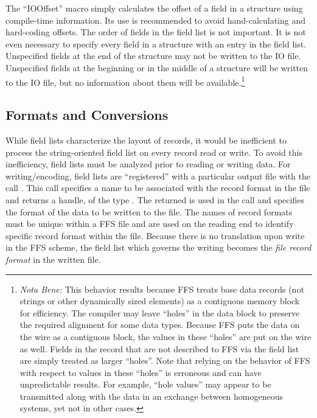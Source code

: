 The ``IOOffset'' macro simply calculates the offset of a field in a structure
using compile-time information.  Its use is recommended to avoid
hand-calculating and hard-coding offsets.  The order of fields in the field
list is not important.  It is not even necessary to specify every field
in a structure with an entry in the field list. Unspecified fields at the end
of the structure may not be written to the IO file.  Unspecified fields
at the beginning or in the middle of a structure will be written to the IO
file, but no information about them will be available.\footnote{{\it Nota
Bene:} This behavior results because FFS treats base data records (not
strings or other dynamically sized elements) as a contiguous memory block
for efficiency.  The compiler may leave ``holes'' in the data block to
preserve the required alignment for some data types.  Because FFS puts the
data on the wire as a contiguous block, the values in these ``holes'' are put
on the wire as well.  Fields in the record that are not described to FFS
via the field list are simply treated as larger ``holes''.  Note that
relying on the behavior of FFS with respect to values in these ``holes''
is erroneous and can have unpredictable results.  For example, ``hole
values'' may appear to be transmitted along with the data in an exchange
between homogeneous systems, yet not in other cases.}
\subsection{Formats and Conversions}

While field lists characterize the layout of records, it would be inefficient
to process the string-oriented field list on every record read or write.  To
avoid this inefficiency, field lists must be analyzed prior to reading or
writing data.  For writing/encoding, field lists are ``registered'' with a
particular output file with the call .  This
call specifies a name to be associated with the record format in the file and
returns a handle, of the type .  The returned  is used in
the 
 call and specifies the format of the data to be written to the
file.  The names of record formats must be unique within a FFS file and are
used on the reading end to identify specific record format within the file.
Because there is no translation upon write in the FFS scheme, the field list
which governs the writing  becomes the {\it file record format} in
the written file.

